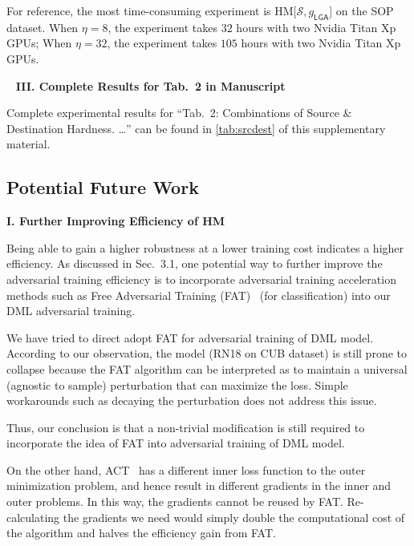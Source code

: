 For reference, the most time-consuming experiment is
HM[$\mathcal{S},g_\mathsf{LGA}$] on the SOP dataset.
%
When $\eta=8$, the experiment takes $32$ hours with two Nvidia Titan Xp GPUs;
%
When $\eta=32$, the experiment takes $105$ hours with two Nvidia Titan Xp GPUs.

~\newline
\noindent\textbf{III. Complete Results for Tab.~2 in Manuscript}



Complete experimental results for ``Tab.~2: Combinations of Source \&
Destination Hardness. \ldots'' can be found in \cref{tab:srcdest} of this
supplementary material.

\subsection{Potential Future Work}

\noindent\textbf{I. Further Improving Efficiency of HM}

Being able to gain a higher robustness at a lower training cost indicates a
higher efficiency.
%
As discussed in Sec.~3.1, one potential way to further improve the adversarial
training efficiency is to incorporate adversarial training acceleration methods
such as Free Adversarial Training (FAT)~\cite{freeat} (for classification) into
our DML adversarial training.

We have tried to direct adopt FAT for adversarial training of DML model.
%
According to our observation, the model (RN18 on CUB dataset) is still prone
to collapse because the FAT algorithm can be interpreted as to maintain
a universal (agnostic to sample) perturbation that can maximize the loss.
%
Simple workarounds such as decaying the perturbation does not address this
issue.

Thus, our conclusion is that a non-trivial modification is still required
to incorporate the idea of FAT into adversarial training of DML model.

On the other hand, ACT~\cite{robrank} has a different inner loss function to
the outer minimization problem, and hence result in different gradients in the
inner and outer problems.
%
In this way, the gradients cannot be reused by FAT.
%
Re-calculating the gradients we need would simply double the
computational cost of the algorithm and halves the efficiency gain from FAT.

